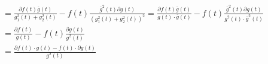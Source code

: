 \documentclass[12pt,UTF8]{ctexbook}
\begin{document}
\begin{align*}
%
    &= \frac{\partial f(t)\overline{g}(t)}{g_1^2(t) + g_2^2 (t)} - f(t)\frac{ \overline{g}^2(t) \partial g(t) }{\left(g_1^2(t) + g_2^2 (t)\right)^2} = \frac{\partial f(t)\overline{g}(t)}{g(t) \cdot \overline{g}(t)} - f(t)\frac{ \overline{g}^2(t) \partial g(t) }{g^2(t) \cdot \overline{g}^2(t)} \\
    &= \frac{\partial f(t)}{g(t)} - f(t)\frac{  \partial g(t) }{g^2(t) } \\
    &= \frac{\partial f(t) \cdot g(t) - f(t) \cdot \partial g(t) }{g^2(t) }
\end{align*}
\end{document}

